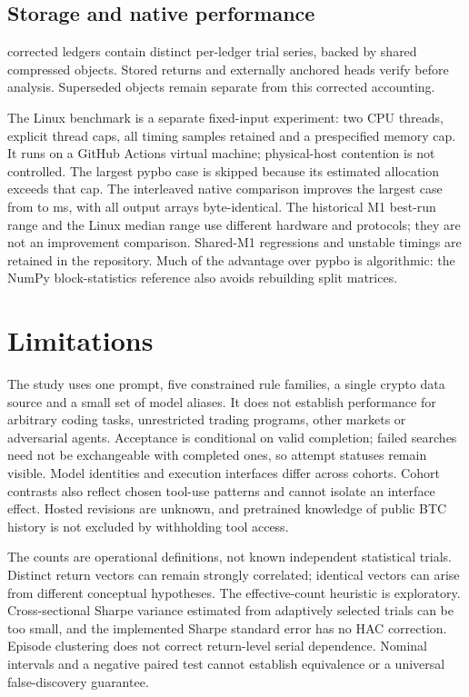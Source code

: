 \documentclass[11pt]{article}
\begin{document}
\subsection{Storage and native performance}
\StoredLedgers{} corrected ledgers contain \StoredTrials{} distinct per-ledger
trial series, backed by \StoredObjects{} shared compressed objects. Stored returns
and externally anchored heads verify before analysis. Superseded objects remain
separate from this corrected accounting.

The Linux benchmark is a separate fixed-input experiment: two CPU threads,
explicit thread caps, all timing samples retained and a prespecified memory cap.
It runs on a GitHub Actions virtual machine; physical-host contention is not
controlled.
The largest pypbo case is skipped because its estimated allocation exceeds that
cap. The interleaved native comparison improves the largest case from
\RustOriginalMs{} to \RustFinalMs{} ms, with all output arrays byte-identical.
The historical M1 best-run range and the Linux median range use different
hardware and protocols; they are not an improvement comparison. Shared-M1
regressions and unstable timings are retained in the repository. Much of the
advantage over pypbo is algorithmic: the NumPy block-statistics reference also
avoids rebuilding split matrices.

\section{Limitations}
The study uses one prompt, five constrained rule families, a single crypto data
source and a small set of model aliases. It does not establish performance for
arbitrary coding tasks, unrestricted trading programs, other markets or
adversarial agents. Acceptance is conditional on valid completion; failed searches
need not be exchangeable with completed ones, so attempt statuses remain visible.
Model identities and execution interfaces differ across cohorts. Cohort contrasts
also reflect chosen tool-use patterns and cannot isolate an interface effect.
Hosted revisions are unknown, and pretrained knowledge of
public BTC history is not excluded by withholding tool access.

The counts are operational definitions, not known independent statistical trials.
Distinct return vectors can remain strongly correlated; identical vectors can
arise from different conceptual hypotheses. The effective-count heuristic is
exploratory. Cross-sectional Sharpe variance estimated from adaptively selected
trials can be too small, and the implemented Sharpe standard error has no HAC
correction. Episode clustering does not correct return-level serial dependence.
Nominal intervals and a negative paired test cannot establish equivalence or a
universal false-discovery guarantee.
\end{document}

